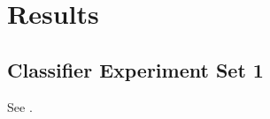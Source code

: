 \documentclass[../thesis/thesis.tex]{subfiles}
\begin{document}
 \chapter{Results}

 \section{Classifier Experiment Set 1}
 See .

\end{document}
